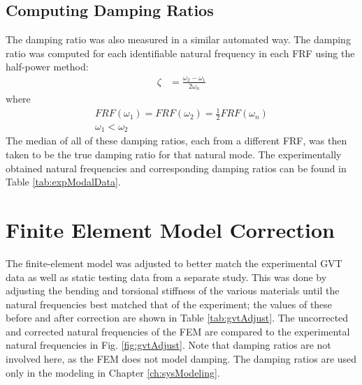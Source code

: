 \subsection{Computing Damping Ratios}

The damping ratio was also measured in a similar automated way. The damping ratio was computed for each identifiable natural frequency in each FRF using the half-power method:
\begin{align}
	\zeta &= \frac{\omega_2 - \omega_1}{2\omega_n}
\end{align}
where
\begin{equation}
\begin{gathered}
	FRF(\omega_1) = FRF(\omega_2) = \frac{1}{2} FRF(\omega_n) \\
	\omega_1 < \omega_2
\end{gathered}
\end{equation}
The median of all of these damping ratios, each from a different FRF, was then taken to be the true damping ratio for that natural mode. The experimentally obtained natural frequencies and corresponding damping ratios can be found in Table \ref{tab:expModalData}.

\section{Finite Element Model Correction} %
\label{sec:femCorrection}

The finite-element model was adjusted to better match the experimental GVT data as well as static testing data from a separate study. This was done by adjusting the bending and torsional stiffness of the various materials until the natural frequencies best matched that of the experiment; the values of these before and after correction are shown in Table \ref{tab:gvtAdjust}. The uncorrected and corrected natural frequencies of the FEM are compared to the experimental natural frequencies in Fig. \ref{fig:gvtAdjust}. Note that damping ratios are not involved here, as the FEM does not model damping. The damping ratios are used only in the modeling in Chapter \ref{ch:sysModeling}.

